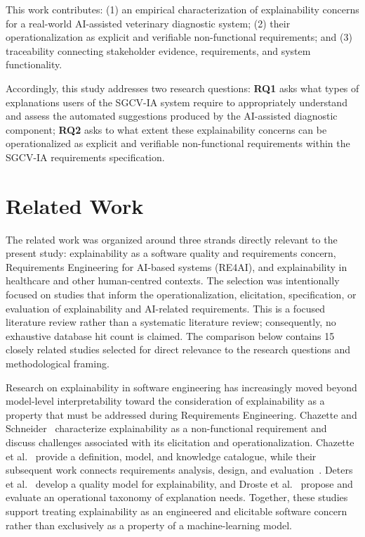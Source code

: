 \documentclass[pdflatex,sn-mathphys-num,Numbered]{sn-jnl}
\begin{document}
This work contributes: (1) an empirical characterization of explainability concerns for a real-world AI-assisted veterinary diagnostic system; (2) their operationalization as explicit and verifiable non-functional requirements; and (3) traceability connecting stakeholder evidence, requirements, and system functionality.

Accordingly, this study addresses two research questions: \textbf{RQ1} asks what types of explanations users of the SGCV-IA system require to appropriately understand and assess the automated suggestions produced by the AI-assisted diagnostic component; \textbf{RQ2} asks to what extent these explainability concerns can be operationalized as explicit and verifiable non-functional requirements within the SGCV-IA requirements specification.


\section{Related Work}\label{sec2}

The related work was organized around three strands directly relevant to the present study: explainability as a software quality and requirements concern, Requirements Engineering for AI-based systems (RE4AI), and explainability in healthcare and other human-centred contexts. The selection was intentionally focused on studies that inform the operationalization, elicitation, specification, or evaluation of explainability and AI-related requirements. This is a focused literature review rather than a systematic literature review; consequently, no exhaustive database hit count is claimed. The comparison below contains 15 closely related studies selected for direct relevance to the research questions and methodological framing.

Research on explainability in software engineering has increasingly moved beyond model-level interpretability toward the consideration of explainability as a property that must be addressed during Requirements Engineering. Chazette and Schneider~\cite{chazette2020} characterize explainability as a non-functional requirement and discuss challenges associated with its elicitation and operationalization. Chazette et al.~\cite{chazette2021} provide a definition, model, and knowledge catalogue, while their subsequent work connects requirements analysis, design, and evaluation~\cite{chazette2022}. Deters et al.~\cite{deters2024} develop a quality model for explainability, and Droste et al.~\cite{droste2025} propose and evaluate an operational taxonomy of explanation needs. Together, these studies support treating explainability as an engineered and elicitable software concern rather than exclusively as a property of a machine-learning model.
\end{document}
